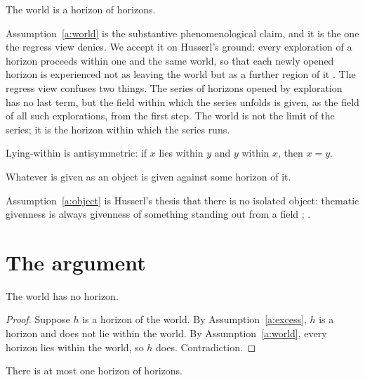 \documentclass{situationist-preprint}
\begin{document}
\begin{assumption}[World]\label{a:world}
The world is a horizon of horizons.
\end{assumption}

Assumption~\ref{a:world} is the substantive phenomenological claim, and it is the one the regress view denies. We accept it on Husserl's ground: every exploration of a horizon proceeds within one and the same world, so that each newly opened horizon is experienced not as leaving the world but as a further region of it \citep[§37]{Husserl1954}. The regress view confuses two things. The series of horizons opened by exploration has no last term, but the field within which the series unfolds is given, as the field of all such explorations, from the first step. The world is not the limit of the series; it is the horizon within which the series runs.

\begin{assumption}\label{a:antisymm}
Lying-within is antisymmetric: if $x$ lies within $y$ and $y$ within $x$, then $x = y$.
\end{assumption}

\begin{assumption}\label{a:object}
Whatever is given as an object is given against some horizon of it.
\end{assumption}

Assumption~\ref{a:object} is Husserl's thesis that there is no isolated object: thematic givenness is always givenness of something standing out from a field \citep[§8]{Husserl1939}; \citep{Gurwitsch1964}.

\section{The argument}

\begin{theorem}\label{t:main}
The world has no horizon.
\end{theorem}

\begin{proof}
Suppose $h$ is a horizon of the world. By Assumption~\ref{a:excess}, $h$ is a horizon and does not lie within the world. By Assumption~\ref{a:world}, every horizon lies within the world, so $h$ does. Contradiction.
\end{proof}

\begin{corollary}\label{c:unique}
There is at most one horizon of horizons.
\end{corollary}
\end{document}
